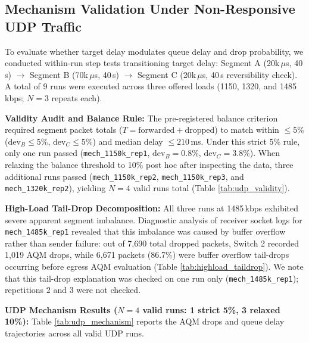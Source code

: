 \documentclass[12pt,a4paper,oneside]{report}
\begin{document}
\subsection{Mechanism Validation Under Non-Responsive UDP Traffic}
To evaluate whether target delay modulates queue delay and drop probability, we conducted within-run step tests transitioning target delay: Segment A (20k\,$\mu$s, 40\,s) $\to$ Segment B (70k\,$\mu$s, 40\,s) $\to$ Segment C (20k\,$\mu$s, 40\,s reversibility check). A total of 9 runs were executed across three offered loads (1150, 1320, and 1485\,kbps; $N=3$ repeats each).

\textbf{Validity Audit and Balance Rule:} The pre-registered balance criterion required segment packet totals ($T = \text{forwarded} + \text{dropped}$) to match within $\le 5\%$ ($\text{dev}_B \le 5\%$, $\text{dev}_C \le 5\%$) and median delay $\le 210$\,ms. Under this strict 5\% rule, only one run passed (\texttt{mech\_1150k\_rep1}, $\text{dev}_B = 0.8\%$, $\text{dev}_C = 3.8\%$). When relaxing the balance threshold to 10\% post hoc after inspecting the data, three additional runs passed (\texttt{mech\_1150k\_rep2}, \texttt{mech\_1150k\_rep3}, and \texttt{mech\_1320k\_rep2}), yielding $N=4$ valid runs total (Table \ref{tab:udp_validity}).



\textbf{High-Load Tail-Drop Decomposition:} All three runs at 1485\,kbps exhibited severe apparent segment imbalance. Diagnostic analysis of receiver socket logs for \texttt{mech\_1485k\_rep1} revealed that this imbalance was caused by buffer overflow rather than sender failure: out of 7,690 total dropped packets, Switch 2 recorded 1,019 AQM drops, while 6,671 packets (86.7\%) were buffer overflow tail-drops occurring before egress AQM evaluation (Table \ref{tab:highload_taildrop}). We note that this tail-drop explanation was checked on one run only (\texttt{mech\_1485k\_rep1}); repetitions 2 and 3 were not checked.



\textbf{UDP Mechanism Results ($N=4$ valid runs: 1 strict 5\%, 3 relaxed 10\%):} Table \ref{tab:udp_mechanism} reports the AQM drops and queue delay trajectories across all valid UDP runs.


\end{document}
